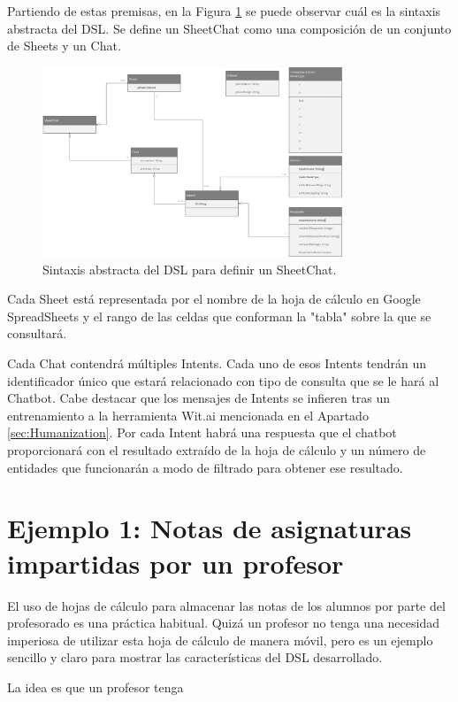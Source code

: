 Partiendo de estas premisas, en la Figura \ref{fig:metamodel} se puede observar cuál es la sintaxis abstracta del DSL. Se define un SheetChat como una composición de un conjunto de Sheets y un Chat.

\begin{figure}[htb]
	\centering
	\includegraphics[width=0.8\textwidth]{./figs/Metamodel.png}
	\caption{Sintaxis abstracta del DSL para definir un SheetChat.} \label{fig:metamodel}
\end{figure}


Cada Sheet está representada por el nombre de la hoja de cálculo en Google SpreadSheets y el rango de las celdas que conforman la "tabla" sobre la que se consultará.

Cada Chat contendrá múltiples Intents. Cada uno de esos Intents tendrán un identificador único que estará relacionado con tipo de consulta que se le hará al Chatbot. Cabe destacar que los mensajes de Intents se infieren tras un entrenamiento a la herramienta Wit.ai mencionada en el Apartado \ref{sec:Humanization}. Por cada Intent habrá una respuesta que el chatbot proporcionará con el resultado extraído de la hoja de cálculo y un número de entidades que funcionarán a modo de filtrado para obtener ese resultado.

\section{Ejemplo 1: Notas de asignaturas impartidas por un profesor}

El uso de hojas de cálculo para almacenar las notas de los alumnos por parte del profesorado es una práctica habitual. Quizá un profesor no tenga una necesidad imperiosa de utilizar esta hoja de cálculo de manera móvil, pero es un ejemplo sencillo y claro para mostrar las características del DSL desarrollado.

La idea es que un profesor tenga 


